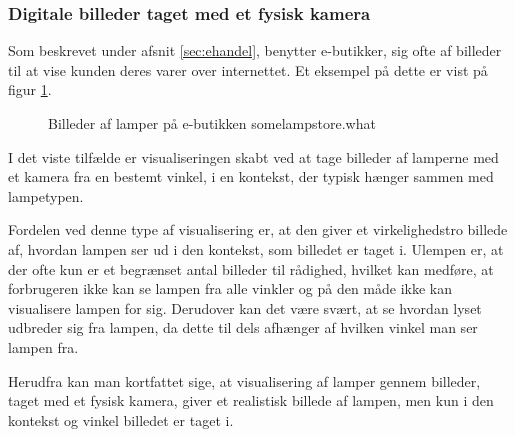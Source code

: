 \subsubsection{Digitale billeder taget med et fysisk kamera}
Som beskrevet under afsnit \ref{sec:ehandel}, benytter e-butikker, sig ofte af billeder til at vise kunden deres varer over internettet. Et eksempel på dette er vist på figur \ref{fig:e_handel_lampebilleder}.

\begin{figure}[H]
    \centering
    \fbox{\rule{\textwidth}{5cm}}
    \caption{Billeder af lamper på e-butikken somelampstore.what}
    \label{fig:e_handel_lampebilleder}
\end{figure} 

I det viste tilfælde er visualiseringen skabt ved at tage billeder af lamperne med et kamera fra en bestemt vinkel, i en kontekst, der typisk hænger sammen med lampetypen. 

Fordelen ved denne type af visualisering er, at den giver et virkelighedstro billede af, hvordan lampen ser ud i den kontekst, som billedet er taget i. Ulempen er, at der ofte kun er et begrænset antal billeder til rådighed, hvilket kan medføre, at forbrugeren ikke kan se lampen fra alle vinkler og på den måde ikke kan visualisere lampen for sig. Derudover kan det være svært, at se hvordan lyset udbreder sig fra lampen, da dette til dels afhænger af hvilken vinkel man ser lampen fra. 

Herudfra kan man kortfattet sige, at visualisering af lamper gennem billeder, taget med et fysisk kamera, giver et realistisk billede af lampen, men kun i den kontekst og vinkel billedet er taget i. 



